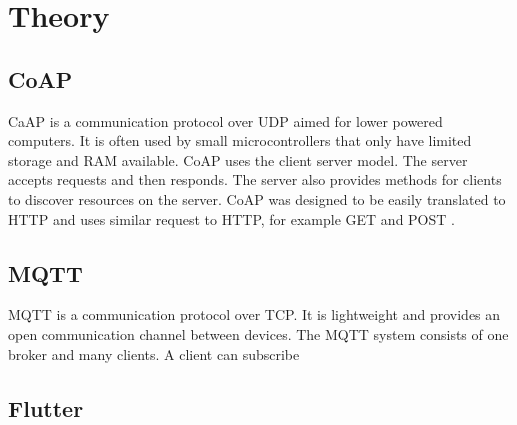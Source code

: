\section{Theory}
\label{ch:theory}
\noindent

\subsection{CoAP}
CaAP is a communication protocol over UDP aimed for lower powered computers. It is often used by small microcontrollers that only have limited storage and RAM available. CoAP uses the client server model. The server accepts requests and then responds. The server also provides methods for clients to discover resources on the server. CoAP was designed to be easily translated to HTTP and uses similar request to HTTP, for example GET and POST \cite{rfc7252}.

\subsection{MQTT}
MQTT is a communication protocol over TCP. It is lightweight and provides an open communication channel between devices. The MQTT system consists of one broker and many clients. A client can subscribe 
\subsection{Flutter}





